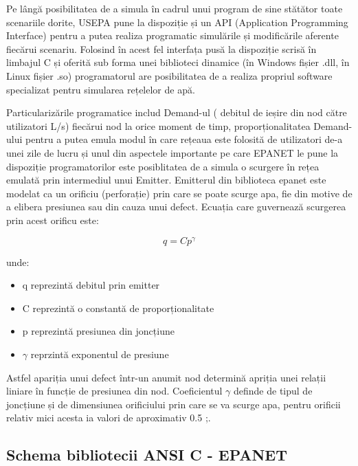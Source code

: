 Pe lângă posibilitatea de a simula în cadrul unui program de sine stătător toate scenariile dorite, USEPA pune la dispoziție și un API (Application Programming Interface) pentru a putea realiza programatic simulările și modificările aferente fiecărui scenariu. Folosind în acest fel interfața pusă la dispoziție scrisă în limbajul C și oferită sub forma unei biblioteci dinamice (în Windows fișier .dll, în Linux fișier .so) programatorul are posibilitatea de a realiza propriul software specializat pentru simularea rețelelor de apă. 

Particularizările programatice includ Demand-ul ( debitul de ieșire din nod către utilizatori L/s) fiecărui nod la orice moment de timp, proporționalitatea Demand-ului pentru a putea emula modul în care rețeaua este folosită de utilizatori de-a unei zile de lucru și unul din aspectele importante pe care EPANET le pune la dispoziție programatorilor este posiblitatea de a simula o scurgere în rețea emulată prin intermediul unui Emitter. Emitterul din biblioteca epanet este modelat ca un orificiu (perforație) prin care se poate scurge apa, fie din motive de a elibera presiunea sau din cauza unui defect. Ecuația care guvernează scurgerea prin acest orificu este:

\begin{equation}
\label{eq:emitter}
    q = Cp^\gamma
\end{equation}

unde:
\begin{itemize}
    \item q reprezintă debitul prin emitter
    \item C reprezintă o constantă de proporționalitate
    \item p reprezintă presiunea din joncțiune
    \item $\gamma$ reprzintă exponentul de presiune
\end{itemize}

Astfel apariția unui defect într-un anumit nod determină apriția unei relații liniare în funcție de presiunea din nod. Coeficientul $\gamma$ definde de tipul de joncțiune și de dimensiunea orificiului prin care se va scurge apa, pentru orificii relativ mici acesta ia valori de aproximativ 0.5 ;\cite{rossman2000epanet}.

\subsection{Schema bibliotecii ANSI C - EPANET}


